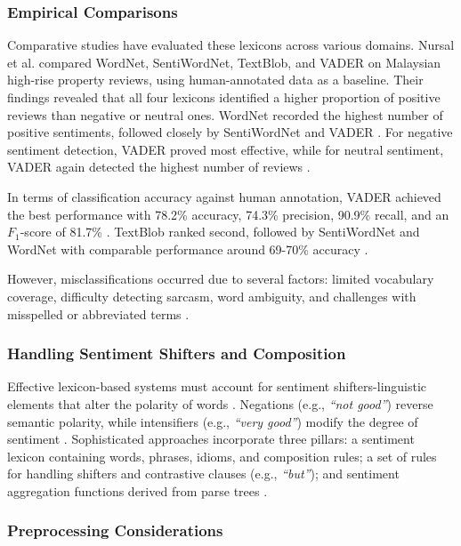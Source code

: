 \documentclass[a4paper,twoside,12pt]{book}
\newcommand{\literal}[1]{\textit{``#1''}}
\begin{document}
\subsubsection{Empirical Comparisons}

Comparative studies have evaluated these lexicons across various domains. Nursal et al. \cite{nursal2025battle} compared WordNet, SentiWordNet, TextBlob, and VADER on Malaysian high-rise property reviews, using human-annotated data as a baseline. Their findings revealed that all four lexicons identified a higher proportion of positive reviews than negative or neutral ones. WordNet recorded the highest number of positive sentiments, followed closely by SentiWordNet and VADER \cite{nursal2025battle}. For negative sentiment detection, VADER proved most effective, while for neutral sentiment, VADER again detected the highest number of reviews \cite{nursal2025battle}.

In terms of classification accuracy against human annotation, VADER achieved the best performance with 78.2\% accuracy, 74.3\% precision, 90.9\% recall, and an $F_1$-score of 81.7\% \cite{nursal2025battle}. TextBlob ranked second, followed by SentiWordNet and WordNet with comparable performance around 69-70\% accuracy \cite{nursal2025battle}.

However, misclassifications occurred due to several factors: limited vocabulary coverage, difficulty detecting sarcasm, word ambiguity, and challenges with misspelled or abbreviated terms \cite{nursal2025battle}.

\subsubsection{Handling Sentiment Shifters and Composition}

Effective lexicon-based systems must account for sentiment shifters-linguistic elements that alter the polarity of words \cite{azzeddine2018sentiment, behdenna2018document}. Negations (e.g., \literal{not good}) reverse semantic polarity, while intensifiers (e.g., \literal{very good}) modify the degree of sentiment \cite{azzeddine2018sentiment}. Sophisticated approaches incorporate three pillars: a sentiment lexicon containing words, phrases, idioms, and composition rules; a set of rules for handling shifters and contrastive clauses (e.g., \literal{but}); and sentiment aggregation functions derived from parse trees \cite{azzeddine2018sentiment}.

\subsubsection{Preprocessing Considerations}
\end{document}

